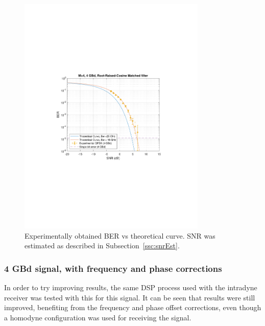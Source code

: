 \begin{refsection}
\begin{figure}[H]
	\centering
	\includegraphics[clip, trim=4cm 8cm 4cm 8cm,
	width=0.8\textwidth]{./sdf/m_qam_system/figures/expResults/homodyne/4GBdBERNoComp20180611.pdf}
	\caption{Experimentally obtained BER vs theoretical curve. SNR was estimated as described in Subsection~\ref{ssc:snrEst}.}
	\label{fig:4GBdFinalBERcurveHm}
\end{figure}


\subsubsection{4 GBd signal, with frequency and phase corrections}

In order to try improving results, the same DSP process used with the intradyne receiver was tested with this for this signal. It can be seen that results were still  improved, benefiting from the frequency and phase offset corrections, even though a homodyne configuration was used for receiving the signal. 



\end{refsection}
